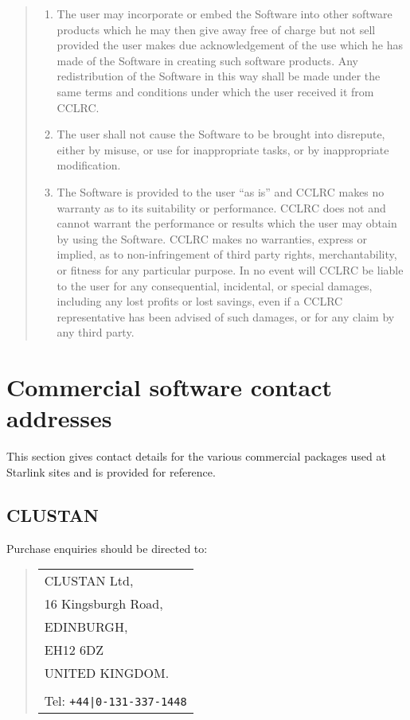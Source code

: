 \documentclass[twoside,11pt]{article}
\newcommand{\xlabel}[1]{}
\renewcommand{\_}{\texttt{\symbol{95}}}
\begin{document}
\begin{quote}
\begin{enumerate}
\item The user may incorporate or embed the Software into other software
products which he may then give away free of charge but not sell provided
the user makes due acknowledgement of the use which he has made of the
Software in creating such software products.   Any redistribution of the
Software in this way shall be made under the same terms and conditions
under which the user received it from CCLRC.
 
\item The user shall not cause the Software to be brought into disrepute,
either by misuse, or use for inappropriate tasks, or by inappropriate
modification.
 
\item The Software is provided to the user ``as is'' and CCLRC makes no
warranty as to its suitability or performance.   CCLRC does not and
cannot warrant the performance or results which the user may obtain by
using the Software.  CCLRC makes no warranties, express or implied, as
to non-infringement of third party rights, merchantability, or fitness
for any particular purpose.  In no event will CCLRC be liable to the
user for any consequential, incidental, or special damages, including
any lost profits or lost savings, even if a CCLRC representative has
been advised of such damages, or for any claim by any third party.

\end{enumerate}
\end{quote}

\newpage
\section{\xlabel{commercial_software_contact_addresses}Commercial software contact addresses}
\label{commercial_software_contact_addresses}

This section gives contact details for the various commercial packages used 
at Starlink sites and is provided for reference.  

\subsection{\xlabel{clustan}CLUSTAN}
\label{clustan}

Purchase enquiries should be directed to:

\begin{quote}
\begin{tabular}{l}
CLUSTAN Ltd,\\
16 Kingsburgh Road,\\
EDINBURGH,\\
EH12 6DZ\\
UNITED KINGDOM.\\
\\
Tel: \texttt{+44|0-131-337-1448}
\end{tabular}
\end{quote}
\end{document}
